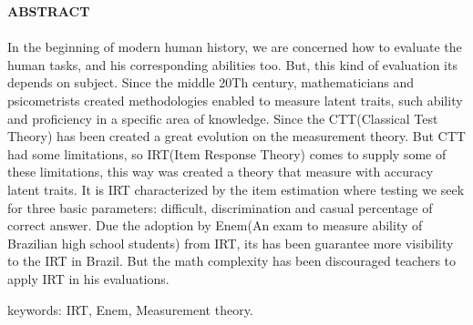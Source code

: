        \begin{center}
	    \textbf{ABSTRACT}
	     \end{center}
	    \paragraph{}
	        In the beginning of modern human history, we are concerned how to evaluate the human tasks, and his corresponding abilities too. But, this kind of evaluation its depends on subject. Since the middle 20Th century, mathematicians and psicometrists created methodologies enabled to measure latent traits, such ability and proficiency in a specific area of knowledge. Since the CTT(Classical Test Theory) has been created a great evolution on the measurement theory. But CTT had some limitations, so IRT(Item Response Theory) comes to supply some of these limitations, this way was created a theory that measure with accuracy latent traits. It is IRT characterized by the item estimation  where testing we seek for three basic parameters: difficult, discrimination and casual percentage of correct answer. Due the adoption by Enem(An exam to measure ability of Brazilian high school students) from IRT, its has
	       been guarantee more visibility to the IRT in Brazil. But the math complexity has been discouraged teachers to apply IRT in his evaluations.
    \par
    keywords: IRT, Enem, Measurement theory.
	
	\newpage